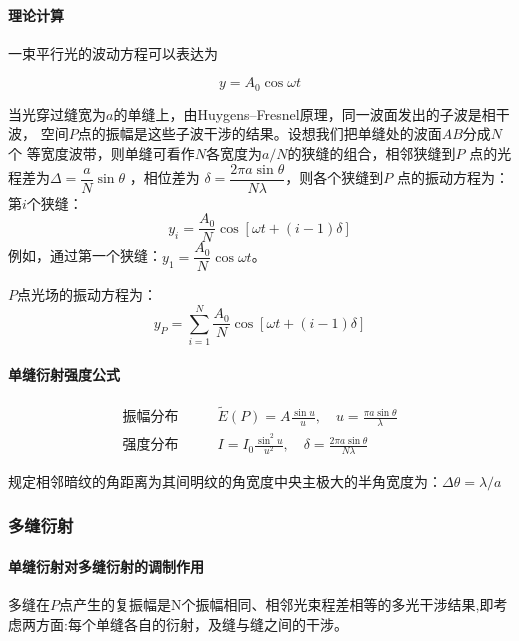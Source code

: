 \documentclass[a4paper]{../phyreport}
\begin{document}
\paragraph{理论计算}

一束平行光的波动方程可以表达为

\begin{equation}
  y = A_0 \cos \omega t
\end{equation}

当光穿过缝宽为$a$的单缝上，由Huygens–Fresnel原理，同一波面发出的子波是相干波，
空间$P$点的振幅是这些子波干涉的结果。设想我们把单缝处的波面$AB$分成$N$个
等宽度波带，则单缝可看作$N$各宽度为$a/N$的狭缝的组合，相邻狭缝到$P$
点的光程差为$\Delta = \dfrac{a}{N}\sin \theta $ ，相位差为
$\delta = \dfrac{2 \pi a \sin \theta }{N \lambda}$，则各个狭缝到$P$ 点的振动方程为：第$i$个狭缝：
\begin{equation}
y_i=\dfrac{A_0}{N}\cos[\omega t + (i -1)\delta]
\end{equation}
例如，通过第一个狭缝：$y_1=\dfrac{A_0}{N}\cos \omega t$。

$P$点光场的振动方程为：
\begin{equation}
  y_P=\sum_{i=1}^{N}\frac{A_0}{N}\cos[\omega t + (i -1)\delta]
\end{equation}

\paragraph{单缝衍射强度公式}

\begin{align}
  \text{振幅分布} \qquad  & \tilde{E}(P)  =A\frac{\sin u}{u},  \quad u=\frac{\pi a \sin \theta}{\lambda} \\
  \text{强度分布}  \qquad & I =I_0 \frac{\sin^2 u}{u^2}, \quad \delta = \frac{2 \pi a \sin \theta}{N \lambda}
\end{align}

规定相邻暗纹的角距离为其间明纹的角宽度中央主极大的半角宽度为：$\Delta \theta = \lambda / a$

\subsubsection{多缝衍射}

\paragraph{单缝衍射对多缝衍射的调制作用}

多缝在$P$点产生的复振幅是N个振幅相同、相邻光束程差相等的多光干涉结果,即考虑两方面:每个单缝各自的衍射，及缝与缝之间的干涉。
\end{document}
